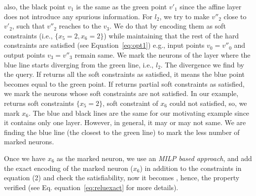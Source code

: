also, the black point $v_1$ is the same as the green point $v'_1$ since the affine layer does not introduce any spurious information. 
For $l_2$, we try to make $v''_2$ close to $v'_2$, such that $v''_2$ reaches to the $v_3$. We do that by encoding 
them as soft constraints (i.e.,  $\{x_5=2, x_6=2\}$) 
while maintaining that the rest of the hard constraints are satisfied (see Equation~\ref{eq:opt1})
e.g., input points $v_0=v''_0$ and output points $v_3=v''_3$ remain same. 
We mark the neurons of the layer where the blue line starts diverging from the green line, i.e., $l_2$. 
The divergence we find by the \maxsat{} query. If \maxsat{} returns all the soft constraints as satisfied, it means
the blue point becomes equal to the green point. If \maxsat{} returns partial soft constraints as satisfied, 
we mark the neurons whose soft constraints are not satisfied. In our example, \maxsat{} returns 
soft constraints $\{x_5=2\}$, soft constraint of $x_6$ could not satisfied, so, we mark $x_6$.
The blue and black lines are the same for our motivating example since it contains only one \relu{} layer. 
However, in general, it may or may not same. We are finding the blue line (the closest to the green line) to mark the 
less number of marked neurons. 




\noindent  
{}\;\;
  \begin{minipage}{0.42\linewidth}
Once we have  $x_6$ as the marked neuron, we use an {\em MILP based approach}, and add the exact encoding of the marked neuron ($x_6$) in addition to the constraints in equation (2) %
and check the satisfiability, now it becomes \unsat{}, hence, the property verified (see Eq. equation~\ref{eq:reluexact} for more details).
\end{minipage}

